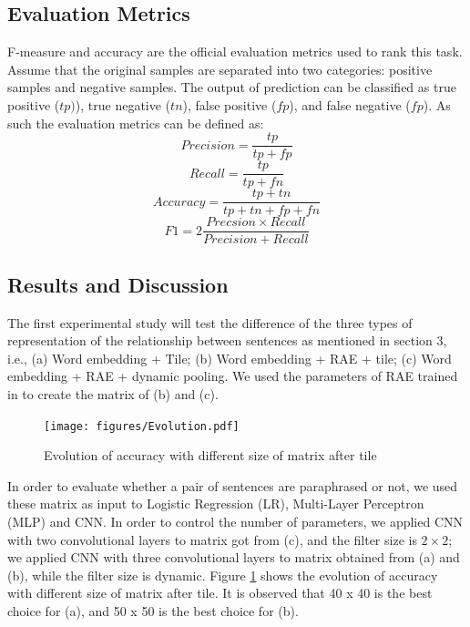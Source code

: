 \documentclass[conference]{IEEEtran}
\begin{document}
\subsection{Evaluation Metrics}
F-measure and accuracy are the official evaluation metrics used to rank this task. Assume that the original samples are separated into two categories: positive samples and negative samples. The output of prediction can be classified as true positive ($tp)$), true negative ($tn$), false positive ($fp$), and false negative ($fp$). As such the evaluation metrics can be defined as:
\begin{equation}
Precision = \frac{tp}{tp + fp}
\end{equation}
\begin{equation}
Recall = \frac{tp}{tp + fn}
\end{equation}
\begin{equation}
Accuracy = \frac{tp+tn}{tp + tn + fp + fn}
\end{equation}
\begin{equation}
F1 = 2\frac{Precsion \times Recall}{Precision + Recall}
\end{equation}


\subsection{Results and Discussion}
The first experimental study will test the difference of the three types of representation of the relationship between sentences as mentioned in section 3, i.e., (a) Word embedding + Tile; (b) Word embedding + RAE + tile; (c) Word embedding + RAE + dynamic pooling. We used the parameters of RAE trained in \cite{DBLP:conf/nips/SocherHPNM11} to create the matrix of (b) and (c).

\begin{figure}
	\centering
	\texttt{[image: figures/Evolution.pdf]}
	\caption{Evolution of accuracy with different size of matrix after tile}
	\label{fig:evolution}
\end{figure}

In order to evaluate whether a pair of sentences are paraphrased or not, we used these matrix as input to Logistic Regression (LR), Multi-Layer Perceptron (MLP) and CNN. In order to control the number of parameters, we applied CNN with two convolutional layers to matrix got from (c), and the filter size is $2 \times 2$; we applied CNN with three convolutional layers to matrix obtained from (a) and (b), while the filter size is dynamic. Figure \ref{fig:evolution} shows the evolution of accuracy with different size of matrix after tile. It is observed that 40 x 40 is the best choice for (a), and 50 x 50 is the best choice for (b).
\end{document}
